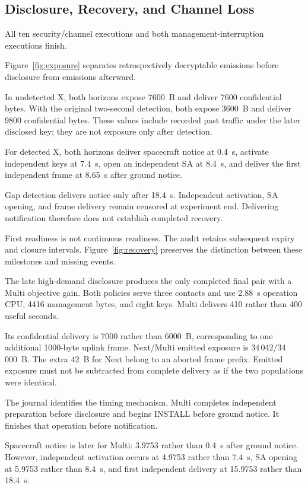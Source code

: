 \documentclass[conference]{IEEEtran}
\begin{document}
\subsection{Disclosure, Recovery, and Channel Loss}

All ten security/channel executions and both
management-interruption executions finish.

Figure~\ref{fig:exposure} separates retrospectively decryptable
emissions before disclosure from emissions afterward.

In undetected X, both horizons expose 7600~B and deliver
7600 confidential bytes.
With the original two-second detection, both expose 3600~B
and deliver 9800 confidential bytes.
These values include recorded past traffic under the later
disclosed key; they are not exposure only after detection.

For detected X, both horizons deliver spacecraft notice at
0.4~s, activate independent keys at 7.4~s, open an independent
SA at 8.4~s, and deliver the first independent frame at
8.65~s after ground notice.

Gap detection delivers notice only after 18.4~s.
Independent activation, SA opening, and frame delivery remain
censored at experiment end.
Delivering notification therefore does not establish completed
recovery.

First readiness is not continuous readiness.
The audit retains subsequent expiry and closure intervals.
Figure~\ref{fig:recovery} preserves the distinction between
these milestones and missing events.

The late high-demand disclosure produces the only completed
final pair with a Multi objective gain.
Both policies serve three contacts and use 2.88~s operation
CPU, 4416 management bytes, and eight keys.
Multi delivers 410 rather than 400 useful seconds.

Its confidential delivery is 7000 rather than 6000~B,
corresponding to one additional 1000-byte uplink frame.
Next/Multi emitted exposure is 34\,042/34\,000~B.
The extra 42~B for Next belong to an aborted frame prefix.
Emitted exposure must not be subtracted from complete delivery
as if the two populations were identical.

The journal identifies the timing mechanism.
Multi completes independent preparation before disclosure
and begins INSTALL before ground notice.
It finishes that operation before notification.

Spacecraft notice is later for Multi:
3.9753 rather than 0.4~s after ground notice.
However, independent activation occurs at 4.9753 rather than
7.4~s, SA opening at 5.9753 rather than 8.4~s, and first
independent delivery at 15.9753 rather than 18.4~s.
\end{document}
